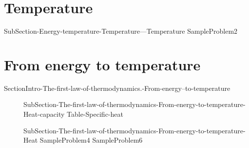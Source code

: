 \documentclass[main.tex]{subfiles}
\newcommand\chapterlabel{Ch-thermochemistry}\setcounter{figurenewcounter}{0}\setcounter{tablenewcounter}{0}\setcounter{formulanewcounter}{0}
\begin{document}
\section{Temperature}
 {SubSection-Energy-temperature-Temperature---Temperature}
{SampleProblem2}
 

\section{From energy  to temperature}{SectionIntro-The-first-law-of-thermodynamics.-From-energy--to-temperature}
\sloppy\begin{description}
\item[] {SubSection-The-first-law-of-thermodynamics-From-energy-to-temperature-Heat-capacity}
{Table-Specific-heat}
\item[] {SubSection-The-first-law-of-thermodynamics-From-energy-to-temperature-Heat}
{SampleProblem4}
{SampleProblem6}
\end{description}
\end{document}
